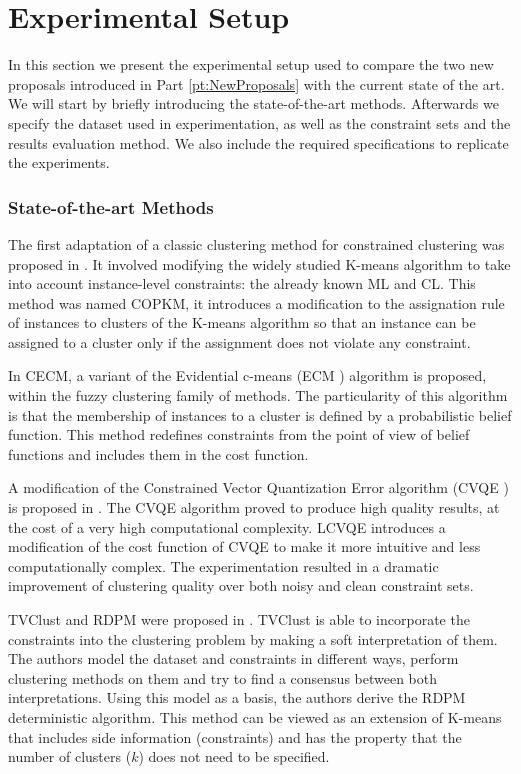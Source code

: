 \chapter{Experimental Setup} \label{ch:ExperimentalSetup}

In this section we present the experimental setup used to compare the two new proposals introduced in Part \ref{pt:NewProposals} with the current state of the art. We will start by briefly introducing the state-of-the-art methods. Afterwards we specify the dataset used in experimentation, as well as the constraint sets and the results evaluation method. We also include the required specifications to replicate the experiments.

\subsection{State-of-the-art Methods} \label{sec:SOTA}

The first adaptation of a classic clustering method for constrained clustering was proposed in \cite{wagstaff2001constrained}. It involved modifying the widely studied K-means algorithm to take into account instance-level constraints: the already known ML and CL. This method was named \acf{COPKM}, it introduces a modification to the assignation rule of instances to clusters of the K-means algorithm so that an instance can be assigned to a cluster only if the assignment does not violate any constraint.

In \cite{antoine2012cecm} \acf{CECM}, a variant of the Evidential c-means (ECM \cite{masson2008ecm}) algorithm is proposed, within the fuzzy clustering family of methods. The particularity of this algorithm is that the membership of instances to a cluster is defined by a probabilistic belief function. This method redefines constraints from the point of view of belief functions and includes them in the cost function.

A modification of the Constrained Vector Quantization Error algorithm (CVQE \cite{davidson2005clustering}) is proposed in \cite{pelleg2007k}. The CVQE algorithm proved to produce high quality results, at the cost of a very high computational complexity. \acf{LCVQE} introduces a modification of the cost function of CVQE to make it more intuitive and less computationally complex. The experimentation resulted in a dramatic improvement of clustering quality over both noisy and clean constraint sets.

\acf{TVClust} and \acf{RDPM} were proposed in \cite{khashabi2015clustering}. \acs{TVClust} is able to incorporate the constraints into the clustering problem by making a soft interpretation of them. The authors model the dataset and constraints in different ways, perform clustering methods on them and try to find a consensus between both interpretations. Using this model as a basis, the authors derive the \acs{RDPM} deterministic algorithm. This method can be viewed as an extension of K-means that includes side information (constraints) and has the property that the number of clusters ($k$) does not need to be specified.

